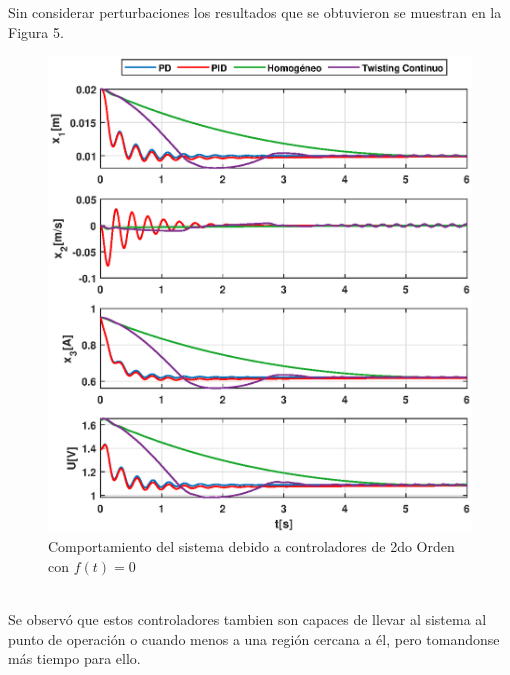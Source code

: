 \documentclass[onecolumn,10pt]{article}
\begin{document}
Sin considerar perturbaciones los resultados que se obtuvieron se muestran en la Figura 5.
\begin{figure}[!h]
\centering
\includegraphics[scale=0.55]{xu_3o_c2o.eps}
\caption{Comportamiento del sistema debido a controladores de 2do Orden con $f(t)=0$}
\end{figure}
\\
Se observ\'o que estos controladores tambien son capaces de llevar al sistema al punto de operaci\'on o cuando menos a una regi\'on cercana a \'el, pero tomandonse m\'as tiempo para ello.
\end{document}

